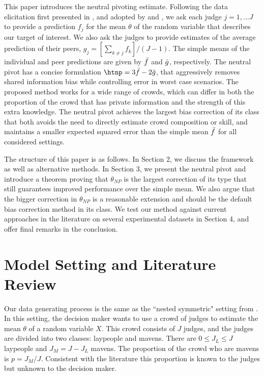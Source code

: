 This paper introduces the neutral pivoting estimate. Following the data elicitation first presented in \cite{mp}, and adopted by \cite{so} and \cite{kw}, we ask each judge $j= 1,...J$ to provide a prediction $f_j$ for the mean $\theta$ of the random variable that describes our target of interest. We also ask the judges to provide estimates of the average prediction of their peers, $g_j = [\sum_{k\neq j}f_k]/(J-1)$. The simple means of the individual and peer predictions are given by $\Bar{f}$ and $\Bar{g}$, respectively. The neutral pivot has a concise formulation $\htnp = 3\Bar{f} -2\Bar{g}$, that aggressively removes shared information bias while controlling error in worst case scenarios. The proposed method works for a wide range of crowds, which can differ in both the proportion of the crowd that has private information and the strength of this extra knowledge.  The neutral pivot achieves the largest bias correction of its class that both avoids the need to directly estimate crowd composition or skill, and maintains a smaller expected squared error than the simple mean $\Bar{f}$ for all considered settings.


The structure of this paper is as follows. In Section 2, we discuss the framework as well as alternative methods. In Section 3, we present the neutral pivot and introduce a theorem proving that $\theta_{NP}$ is the largest correction of its type that still guarantees improved performance over the simple mean. We also argue that the bigger correction in $\theta_{NP}$ is a reasonable extension and should be the default bias correction method in its class. We test our method against current approaches in the literature on several experimental datasets in Section 4, and offer final remarks in the conclusion. 

\section{Model Setting and Literature Review}
Our data generating process is the same as the ``nested symmetric" setting from \cite{mp}. In this setting, the decision maker wants to use a crowd of judges to estimate the mean $\theta$ of a random variable $X$. This crowd consists of $ J $ judges, and the judges are divided into two classes: laypeople and mavens. There are $0\leq J_L \leq J$ laypeople and $J_M = J- J_L$ mavens. The proportion of the crowd who are mavens is $p = J_M / J $. Consistent with the literature \citep{mp,so,kw} this proportion is known to the judges but unknown to the decision maker. 

